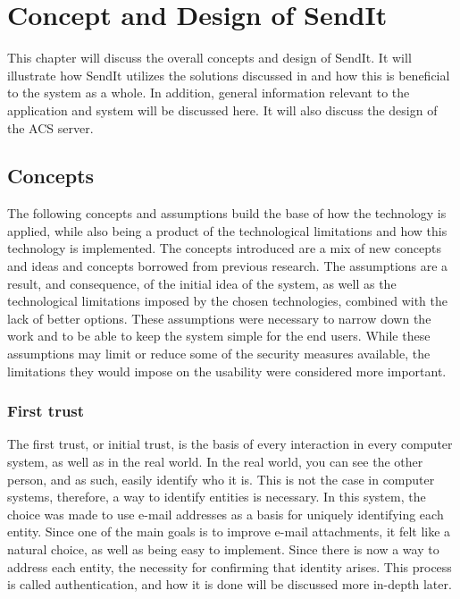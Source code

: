 %
\chapter{Concept and Design of SendIt} %
%
			


\label{Chapter3} %
%
This chapter will discuss the overall concepts and design of SendIt. It will illustrate how SendIt utilizes the solutions discussed in  and how this is beneficial to the system as a whole. In addition, general information relevant to the application and system will be discussed here. It will also discuss the design of the ACS server.

%
\section{Concepts}
%
The following concepts and assumptions build the base of how the technology is applied, while also being a product of the technological limitations and how this technology is implemented. The concepts introduced are a mix of new concepts and ideas and concepts borrowed from previous research. The assumptions are a result, and consequence, of the initial idea of the system, as well as the technological limitations imposed by the chosen technologies, combined with the lack of better options. These assumptions were necessary to narrow down the work and to be able to keep the system simple for the end users. While these assumptions may limit or reduce some of the security measures available, the limitations they would impose on the usability were considered more important.

%
	\subsection{First trust}
		The first trust, or initial trust, is the basis of every interaction in every computer system, as well as in the real world. In the real world, you can see the other person, and as such, easily identify who it is. This is not the case in computer systems, therefore, a way to identify entities is necessary. In this system, the choice was made to use e-mail addresses as a basis for uniquely identifying each entity. Since one of the main goals is to improve e-mail attachments, it felt like a natural choice, as well as being easy to implement. Since there is now a way to address each entity, the necessity for confirming that identity arises. This process is called authentication, and how it is done will be discussed more in-depth later.

